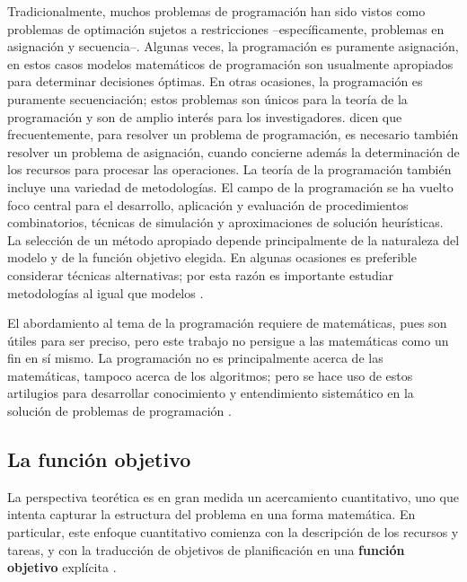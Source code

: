 \documentclass[spanish,draft,12pt,headsepline,footsepline,paper=letter]{scrreprt}
\begin{document}
Tradicionalmente, muchos problemas de programación han sido vistos como problemas de optimación sujetos a restricciones –específicamente, problemas en asignación y secuencia–. Algunas veces, la programación es puramente asignación, en estos casos modelos matemáticos de programación son usualmente apropiados para determinar decisiones óptimas. En otras ocasiones, la programación es puramente secuenciación; estos problemas son únicos para la teoría de la programación y son de amplio interés para los investigadores. \citet[p.~6]{TKindt2002} dicen que frecuentemente, para resolver un problema de programación, es necesario también resolver un problema de asignación, cuando concierne además la determinación de los recursos para procesar las operaciones. La teoría de la programación también incluye una variedad de metodologías. El campo de la programación se ha vuelto foco central para el desarrollo, aplicación y evaluación de procedimientos combinatorios, técnicas de simulación y aproximaciones de solución heurísticas. La selección de un método apropiado depende principalmente de la naturaleza del modelo y de la función objetivo elegida. En algunas ocasiones es preferible considerar técnicas alternativas; por esta razón es importante estudiar metodologías al igual que modelos \citep[p.~4,~5]{Baker2009}.

El abordamiento al tema de la programación requiere de matemáticas, pues son útiles para ser preciso, pero este trabajo no persigue a las matemáticas como un fin en sí mismo. La programación no es principalmente acerca de las matemáticas, tampoco acerca de los algoritmos; pero se hace uso de estos artilugios para desarrollar conocimiento y entendimiento sistemático en la solución de problemas de programación \citep[p.~8]{Baker2009}.
\subsection{La función objetivo}
\label{sub:funcion_objetivo}

La perspectiva teorética es en gran medida un acercamiento cuantitativo, uno que intenta capturar la estructura del problema en una forma matemática.
%
En particular, este enfoque cuantitativo comienza con la descripción de los recursos y tareas, y con la traducción de objetivos de planificación en una \textbf{función objetivo} explícita \citep[p.~3,~4]{Baker2009}.
\end{document}
